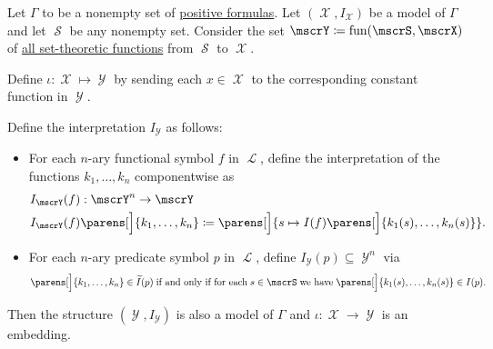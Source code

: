 \begin{proposition}\label{thm:functions_over_model_form_model}
  Let \( \Gamma \) to be a nonempty set of \hyperref[def:positive_formula]{positive formulas}. Let \( (\mscrX, I_\mscrX) \) be a model of \( \Gamma \) and let \( \mscrS \) be any nonempty set. Consider the set \( \mscrY \coloneqq \fun(\mscrS, \mscrX) \) of \hyperref[def:function/single_valued]{all set-theoretic functions} from \( \mscrS \) to \( \mscrX \).

  Define \( \iota: \mscrX \mapsto \mscrY \) by sending each \( x \in \mscrX \) to the corresponding constant function in \( \mscrY \).

  Define the interpretation \( I_\mscrY \) as follows:
  \begin{itemize}
    \item For each \( n \)-ary functional symbol \( f \) in \( \mscrL \), define the interpretation of the functions \( k_1, \ldots, k_n \) componentwise as
    \begin{equation*}
      \begin{aligned}
        &I_\mscrY(f): \mscrY^n \to \mscrY \\
        &I_\mscrY(f) \parens[\Big]{ k_1, \ldots, k_n } \coloneqq \parens[\Big]{ s \mapsto I(f) \parens[\Big]{ k_1(s), \ldots, k_n(s) } }.
      \end{aligned}
    \end{equation*}

    \item For each \( n \)-ary predicate symbol \( p \) in \( \mscrL \), define \( I_\mscrY(p) \subseteq \mscrY^n \) via
    \begin{equation*}
      \parens[\Big]{ k_1, \ldots, k_n } \in \widetilde I(p) \T{if and only if for each} s \in \mscrS \T{we have} \parens[\Big]{ k_1(s), \ldots, k_n(s) } \in I(p).
    \end{equation*}
  \end{itemize}

  Then the structure \( (\mscrY, I_\mscrY) \) is also a model of \( \Gamma \) and \( \iota: \mscrX \to \mscrY \) is an embedding.
\end{proposition}
